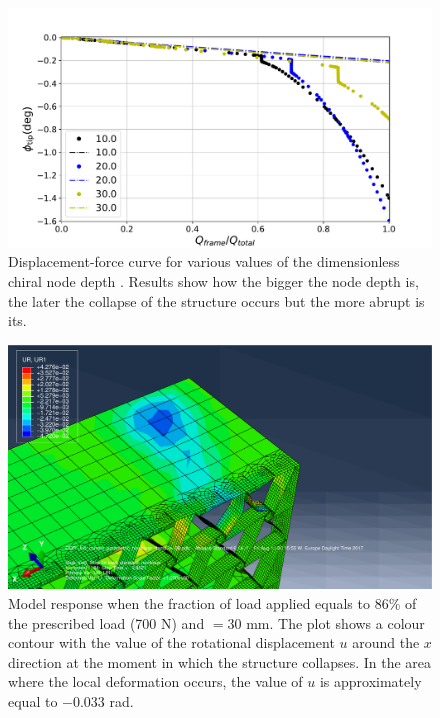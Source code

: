       \begin{figure}[!htpb] %
        \centering
        \includegraphics[width=0.8 \textwidth]{figures/../figures/result-sim/B/force_displacement-far}
        \caption[Displacement-force curve for various values of the dimensionless chiral node depth]{Displacement-force curve for various values of the dimensionless chiral node depth \chiB. Results show how the bigger the node depth \chiB is, the later the collapse of the structure occurs but the more abrupt is its.}\label{fig:forceDisplacement-far-B}
      \end{figure}

      \begin{figure}[!htpb] %
        \centering
        \includegraphics[width=0.8 \textwidth]{figures/../figures/result-sim/B/30_UR1}
        \caption[Model response when the fraction of load applied equals to 86\% of the prescribed load (700 N) and \chiB$= 30$ mm]{Model response when the fraction of load applied equals to 86\% of the prescribed load (700 N) and \chiB$= 30$ mm. The plot shows a colour contour with the value of the rotational displacement $u$ around the $x$ direction at the moment in which the structure collapses. In the area where the local deformation occurs, the value of $u$ is approximately equal to $-0.033$ rad.}
        \label{fig:30_UR1}
      \end{figure}

